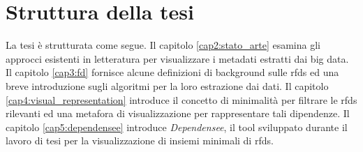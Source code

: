 \section{Struttura della tesi}
La tesi \`{e} strutturata come segue. Il capitolo \ref{cap2:stato_arte} esamina gli approcci esistenti in letteratura per visualizzare i metadati estratti dai big data. Il capitolo \ref{cap3:fd} fornisce alcune definizioni di background sulle \acrlong{rfds} ed una breve introduzione sugli algoritmi per la loro estrazione dai dati. Il capitolo \ref{cap4:visual_representation} introduce il concetto di minimalit\`{a} per filtrare le \acrlong{rfds} rilevanti ed una metafora di visualizzazione per rappresentare tali dipendenze. Il capitolo \ref{cap5:dependensee} introduce \textit{Dependensee}, il tool sviluppato durante il lavoro di tesi per la visualizzazione di insiemi minimali di \acrlong{rfds}.
